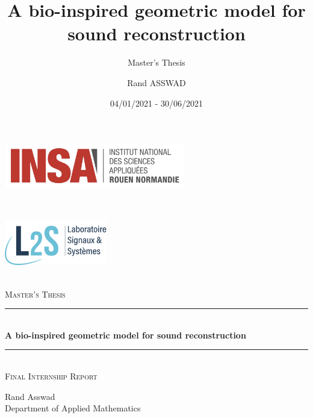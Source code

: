 \documentclass[american,]{article}
\title{A bio-inspired geometric model for sound reconstruction}
\subtitle{Master's Thesis}
\author{Rand ASSWAD}
\date{04/01/2021 - 30/06/2021}
\newcommand{\HRule}{\rule{\linewidth}{0.5mm}}
\theoremstyle{definition}
\theoremstyle{definition}
\theoremstyle{definition}
\theoremstyle{remark}
\begin{document}
\maketitle

\begin{titlepage}
    \begin{sffamily}
        \begin{center}
            \begin{minipage}[c]{0.45\textwidth}
            \raggedright\includegraphics[height=2cm]{img/logo_insa.png}
            \end{minipage}~\hfill~%
            \begin{minipage}[c]{0.45\textwidth}
            \raggedleft\includegraphics[height=2cm]{img/logo_l2s.png}
            \end{minipage}\\[2cm]

            \textsc{\huge Master's Thesis}\\[1cm]

            \HRule \\[0.4cm]
            {\huge \bfseries A bio-inspired geometric model for sound reconstruction \\[0.4cm]}
            \HRule \\[1cm]
            
            \textsc{\huge Final Internship Report}\\[1cm]

            \vfill

            \begin{minipage}{\textwidth}
            \begin{center}\Large
                Rand Asswad\\
                Department of Applied Mathematics
            \end{center}
            \end{minipage} \\[2cm]


\end{center}
\end{sffamily}
\end{titlepage}
\end{document}
